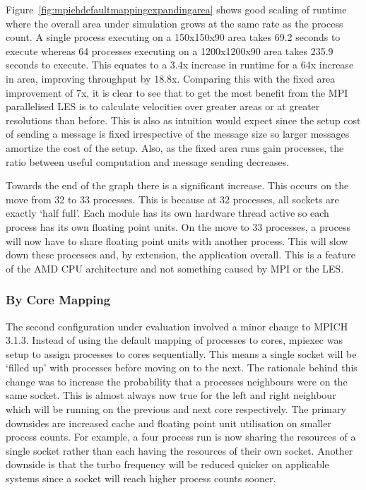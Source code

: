 Figure~\ref{fig:mpichdefaultmappingexpandingarea} shows good scaling of runtime
where the overall area under simulation grows at the same rate as the process
count. A single process executing on a 150x150x90 area takes 69.2 seconds to
execute whereas 64 processes executing on a 1200x1200x90 area takes 235.9
seconds to execute. This equates to a 3.4x increase in runtime for a 64x
increase in area, improving throughput by 18.8x. Comparing this with the fixed
area improvement of 7x, it is clear to see that to get the most benefit from the
MPI parallelised LES is to calculate velocities over greater areas or at greater
resolutions than before. This is also as intuition would expect since the setup
cost of sending a message is fixed irrespective of the message size so larger
messages amortize the cost of the setup. Also, as the fixed area runs gain
processes, the ratio between useful computation and message sending decreases.

Towards the end of the graph there is a significant increase. This occurs on the
move from 32 to 33 processes. This is because at 32 processes, all sockets are
exactly `half full'. Each module has its own hardware thread active so each
process has its own floating point units. On the move to 33 processes, a process
will now have to share floating point units with another process. This will slow
down these processes and, by extension, the application overall. This is a
feature of the AMD CPU architecture and not something caused by MPI or the LES.

\subsubsection{By Core Mapping}

The second configuration under evaluation involved a minor change to MPICH
3.1.3. Instead of using the default mapping of processes to cores, mpiexec was
setup to assign processes to cores sequentially. This means a single socket will
be `filled up' with processes before moving on to the next. The rationale behind
this change was to increase the probability that a processes neighbours were on
the same socket. This is almost always now true for the left and right neighbour
which will be running on the previous and next core respectively. The primary
downsides are increased cache and floating point unit utilisation on smaller
process counts. For example, a four process run is now sharing the resources of
a single socket rather than each having the resources of their own socket.
Another downside is that the turbo frequency will be reduced quicker on
applicable systems since a socket will reach higher process counts sooner.

